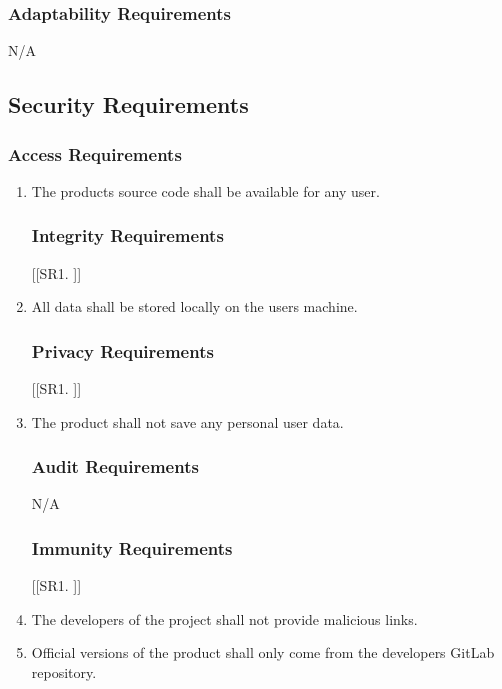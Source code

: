 \documentclass[12pt, titlepage]{article}
\begin{document}
\subsubsection{Adaptability Requirements}
N/A



\subsection{Security Requirements}

\subsubsection{Access Requirements}
\begin{enumerate}[{SR}1. ]
    \item The products source code shall be available for any user.

\subsubsection{Integrity Requirements}
[{[{SR}1. ]}]
    \item All data shall be stored locally on the users machine.

\subsubsection{Privacy Requirements}
[{[{SR}1. ]}]
    \item The product shall not save any personal user data.

\subsubsection{Audit Requirements}
N/A

\subsubsection{Immunity Requirements}
[{[{SR}1. ]}]
    \item The developers of the project shall not provide malicious links.
    \item Official versions of the product shall only come from the developers GitLab repository.
\end{enumerate}
\end{document}
